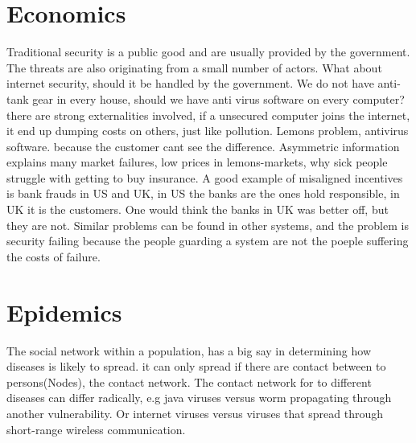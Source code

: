 \section{Economics}
Traditional security is a public good and are usually provided by the government. 
The threats are also originating from a small number of actors. 
What about internet security, should it be handled by the government.
 We do not have anti-tank gear in every house, should we have anti virus software on every computer?
 there are strong externalities involved, if a unsecured computer joins the internet, 
 it end up dumping costs on others, just like pollution. 
 Lemons problem, antivirus software. because the customer cant see the difference.
 Asymmetric information explains many market failures, low prices in lemons-markets, why sick people struggle with getting to buy insurance.
 A good example of misaligned incentives is bank frauds in US and UK, in US the banks are the ones hold responsible, in UK it is the customers. One would think the banks in UK was better off, but they are not. Similar problems can be found in other systems, and the problem is  security failing because the people guarding a system are not the poeple suffering the costs of failure. 
 \section{Epidemics}
 \cite{easley2012networks}
 The social network within a population, has a big say in determining how diseases is likely to
  spread. it can only spread if there are contact between to persons(Nodes), the contact network.
  The contact network for to different diseases can differ radically, e.g java viruses versus worm
   propagating through another vulnerability. Or internet viruses versus viruses that spread through short-range wireless communication. 
